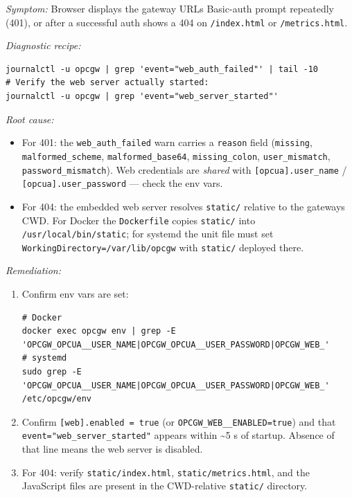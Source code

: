 \emph{Symptom:} Browser displays the gateway URL\textquotesingle s Basic-auth prompt repeatedly (401), or after a successful auth shows a 404 on \texttt{/index.html} or \texttt{/metrics.html}.

\emph{Diagnostic recipe:}

\begin{lstlisting}
journalctl -u opcgw | grep 'event="web_auth_failed"' | tail -10
# Verify the web server actually started:
journalctl -u opcgw | grep 'event="web_server_started"'
\end{lstlisting}

\emph{Root cause:}

\begin{itemize}
\item
  For 401: the \texttt{web\_auth\_failed} warn carries a \texttt{reason} field (\texttt{missing}, \texttt{malformed\_scheme}, \texttt{malformed\_base64}, \texttt{missing\_colon}, \texttt{user\_mismatch}, \texttt{password\_mismatch}). Web credentials are \emph{shared} with \texttt{{[}opcua{]}.user\_name} / \texttt{{[}opcua{]}.user\_password} --- check the env vars.
\item
  For 404: the embedded web server resolves \texttt{static/} relative to the gateway\textquotesingle s CWD. For Docker the \texttt{Dockerfile} copies \texttt{static/} into \texttt{/usr/local/bin/static}; for systemd the unit file must set \texttt{WorkingDirectory=/var/lib/opcgw} with \texttt{static/} deployed there.
\end{itemize}

\emph{Remediation:}

\begin{enumerate}
\def\labelenumi{\arabic{enumi}.}
\item
  Confirm env vars are set:

\begin{lstlisting}
# Docker
docker exec opcgw env | grep -E 'OPCGW_OPCUA__USER_NAME|OPCGW_OPCUA__USER_PASSWORD|OPCGW_WEB_'
# systemd
sudo grep -E 'OPCGW_OPCUA__USER_NAME|OPCGW_OPCUA__USER_PASSWORD|OPCGW_WEB_' /etc/opcgw/env
\end{lstlisting}
\item
  Confirm \texttt{{[}web{]}.enabled\ =\ true} (or \texttt{OPCGW\_WEB\_\_ENABLED=true}) and that \texttt{event="web\_server\_started"} appears within \textasciitilde5 s of startup. Absence of that line means the web server is disabled.
\item
  For 404: verify \texttt{static/index.html}, \texttt{static/metrics.html}, and the JavaScript files are present in the CWD-relative \texttt{static/} directory.
\end{enumerate}

